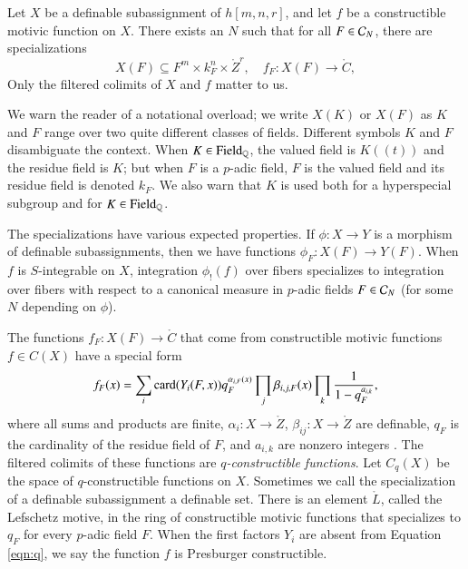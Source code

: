 Let $X$ be a definable subassignment of $h[m,n,r]$, and let $f$ be a
constructible motivic function on $X$.  There exists an $N$ such that
for all $F\in \mathcal C_N$, there are specializations
\[
X(F)\subseteq F^m\times k_F^n\times \ring{Z}^r,  \quad f_F: X(F) \to\ring{C},
\]
Only the  filtered colimits of $X$ and $f$ matter to us.

We warn the reader of a notational overload; we write $X(K)$ or $X(F)$
as $K$ and $F$ range over two quite different classes of fields.
Different symbols $K$ and $F$ disambiguate the context.  When $K\in
{\operatorname{Field}}_{\mathbb{Q}}$, the valued field is $K((t))$ and the residue field is
$K$; but when $F$ is a $p$-adic field, $F$ is the valued field and its
residue field is denoted $k_F$.  We also warn that $K$ is used both for
a hyperspecial subgroup and for $K\in{\operatorname{Field}}_{\mathbb{Q}}$.

The specializations have various expected properties.  If $\phi:X\to
Y$ is a morphism of definable subassignments, then we have functions
$\phi_F:X(F)\to Y(F)$.  When $f$ is $S$-integrable on $X$, integration
$\phi_!(f)$ over fibers specializes to integration over fibers with
respect to a canonical measure in $p$-adic fields $F\in \mathcal C_N$ (for
some $N$ depending on $\phi$).

The functions $f_F:X(F)\to\ring{C}$ that come from constructible
motivic functions $f\in C(X)$ have a special form
\begin{equation}\label{eqn:q}
f_F(x) = \sum_i {\operatorname{card}}(Y_i(F,x)) q_F^{\alpha_{i,F}(x)} 
\prod_j \beta_{i,j,F}(x)\prod_k \frac{1}{1-q_F^{a_{i,k}}},
\end{equation}
where all sums and products are finite, $\alpha_{i}:X\to\ring{Z}$,
$\beta_{ij}:X\to\ring{Z}$ are definable, $q_F$ is the cardinality of
the residue field of $F$, and $a_{i,k}$ are nonzero integers
\cite[\S2]{cluckers2011btransfer}.  The filtered colimits of these
functions are {\it $q$-constructible functions}.  Let $C_q(X)$ be the
space of $q$-constructible functions on $X$.  Sometimes we call the
specialization of a definable subassignment a definable set.  There is
an element $\ring{L}$, called the Lefschetz motive, in the ring of
constructible motivic functions that specializes to $q_F$ for every
$p$-adic field $F$.  When the first factors $Y_i$ are absent from
Equation \ref{eqn:q}, we say the function $f$ is Presburger
constructible.


